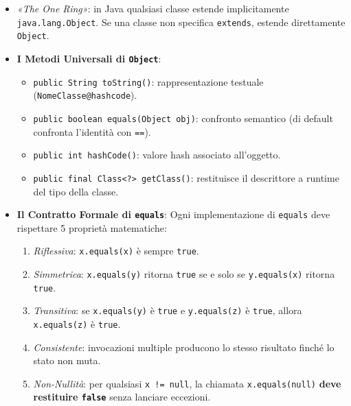 \documentclass[11pt,a4paper]{article}
\newcommand{\passthrough}[1]{#1}
\providecommand{\tightlist}{\setlength{\itemsep}{0pt}\setlength{\parskip}{0pt}}
\begin{document}
\begin{itemize}
\tightlist
\item
  \emph{«The One Ring»}: in Java qualsiasi classe estende implicitamente
  \passthrough{\lstinline!java.lang.Object!}. Se una classe non
  specifica \passthrough{\lstinline!extends!}, estende direttamente
  \passthrough{\lstinline!Object!}.
\item
  \textbf{I Metodi Universali di \passthrough{\lstinline!Object!}}:

  \begin{itemize}
  \tightlist
  \item
    \passthrough{\lstinline!public String toString()!}: rappresentazione
    testuale (\passthrough{\lstinline!NomeClasse@hashcode!}).
  \item
    \passthrough{\lstinline!public boolean equals(Object obj)!}:
    confronto semantico (di default confronta l'identità con
    \passthrough{\lstinline!==!}).
  \item
    \passthrough{\lstinline!public int hashCode()!}: valore hash
    associato all'oggetto.
  \item
    \passthrough{\lstinline!public final Class<?> getClass()!}:
    restituisce il descrittore a runtime del tipo della classe.
  \end{itemize}
\item
  \textbf{Il Contratto Formale di \passthrough{\lstinline!equals!}}:
  Ogni implementazione di \passthrough{\lstinline!equals!} deve
  rispettare 5 proprietà matematiche:

  \begin{enumerate}
  \def\labelenumi{\arabic{enumi}.}
  \tightlist
  \item
    \emph{Riflessiva}: \passthrough{\lstinline!x.equals(x)!} è sempre
    \passthrough{\lstinline!true!}.
  \item
    \emph{Simmetrica}: \passthrough{\lstinline!x.equals(y)!} ritorna
    \passthrough{\lstinline!true!} se e solo se
    \passthrough{\lstinline!y.equals(x)!} ritorna
    \passthrough{\lstinline!true!}.
  \item
    \emph{Transitiva}: se \passthrough{\lstinline!x.equals(y)!} è
    \passthrough{\lstinline!true!} e
    \passthrough{\lstinline!y.equals(z)!} è
    \passthrough{\lstinline!true!}, allora
    \passthrough{\lstinline!x.equals(z)!} è
    \passthrough{\lstinline!true!}.
  \item
    \emph{Consistente}: invocazioni multiple producono lo stesso
    risultato finché lo stato non muta.
  \item
    \emph{Non-Nullità}: per qualsiasi
    \passthrough{\lstinline"x != null"}, la chiamata
    \passthrough{\lstinline!x.equals(null)!} \textbf{deve restituire
    \passthrough{\lstinline!false!}} senza lanciare eccezioni.
  \end{enumerate}
\end{itemize}
\end{document}
